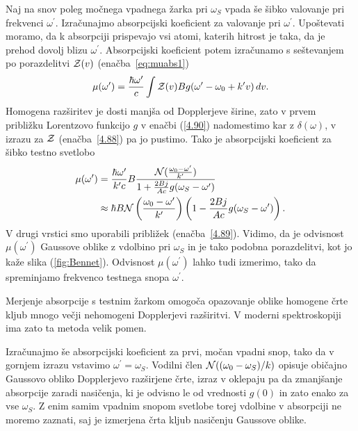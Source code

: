 Naj na snov poleg močnega vpadnega žarka pri $\omega_S$ vpada še šibko valovanje pri 
frekvenci $\omega^{\prime}$. Izračunajmo absorpcijski koeficient za valovanje pri $\omega^\prime$. 
Upoštevati moramo, da k absorpciji prispevajo vsi atomi, katerih
hitrost je taka, da je prehod dovolj blizu $\omega^{\prime}$. Absorpcijski 
koeficient potem izračunamo s seštevanjem 
po porazdelitvi ${\cal Z}(v)$
(enačba~\ref{eq:muabs1})
\begin{equation}
\mu(\omega^{\prime})=\frac{\hbar\omega^{\prime}}{c}\int{\cal Z}(v)Bg(\omega^{\prime}-\omega_{0}+k'v)\, dv.
\label{4.90}
\end{equation}
Homogena razširitev je dosti manjša od Dopplerjeve širine, zato
v prvem približku Lorentzovo funkcijo $g$ v enačbi (\ref{4.90}) nadomestimo kar z
$\delta(\omega)$, v izrazu za $\cal Z$ (enačba~\ref{4.88}) pa jo pustimo. 
Tako je absorpcijski koeficient za šibko testno svetlobo 
\begin{align}
\mu(\omega^{\prime}) & =  \frac{\hbar\omega^{\prime}}{k'c}B\frac{{\cal N}
(\frac{\omega_0-\omega'}{k'})}{1+\frac{2Bj}{Ac}g(\omega_S-\omega')} \\ \nonumber 
 & \approx  \hbar B{\cal N}\left(\frac{\omega_0-\omega'}{k'}\right)\left(1-\frac{2Bj}{Ac}g(\omega_S-\omega')\right).
\end{align}
V drugi vrstici smo uporabili približek (enačba~\ref{4.89}). Vidimo, da je 
odvisnost $\mu(\omega^{\prime})$ Gaussove oblike z vdolbino pri $\omega_S$ in je tako
podobna porazdelitvi, kot jo kaže slika (\ref{fig:Bennet}). Odvisnost 
$\mu(\omega^{\prime})$ lahko tudi izmerimo, tako da spreminjamo 
frekvenco testnega snopa $\omega^{\prime}$.

\begin{remark}
 Merjenje absorpcije s testnim
žarkom omogoča opazovanje oblike homogene črte kljub mnogo večji
nehomogeni Dopplerjevi razširitvi. V moderni spektroskopiji ima zato ta metoda
velik pomen.
\end{remark}

Izračunajmo še absorpcijski koeficient za prvi, močan vpadni snop, tako da v
gornjem izrazu vstavimo $\omega^{\prime}=\omega_S$. Vodilni člen ${\cal N}((\omega_0-
\omega_S)/k)$ opisuje običajno Gaussovo obliko Dopplerjevo
razširjene črte, izraz v oklepaju pa da zmanjšanje absorpcije
zaradi nasičenja, ki je odvisno le od vrednosti $g(0)$ in zato enako za vse $\omega_S$. 
Z enim samim vpadnim snopom svetlobe torej vdolbine v absorpciji ne moremo zaznati, saj 
je izmerjena črta kljub nasičenju Gaussove oblike. 

